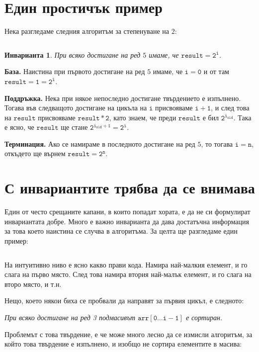 \documentclass{article}
\theoremstyle{definition}
\theoremstyle{plain}
\newtheorem*{invariant}{Инварианта}
\theoremstyle{remark}
\theoremstyle{definition}
\begin{document}
\section*{Един простичък пример}

Нека разгледаме следния алгоритъм за степенуване на $2$:
\inputminted[linenos]{c++}{algorithms/pow2.cpp}

\begin{invariant}
    При всяко достигане на ред $5$ имаме, че $\mathtt{result = 2^i}$.
\end{invariant}

\textbf{База.}
Наистина при първото достигане на ред $5$ имаме, че $\mathtt{i = 0}$ и от там $\mathtt{result = 1 = 2^i}$.

\textbf{Поддръжка.}
Нека при някое непоследно достигане твърдението е изпълнено.
Тогава във следващото достигане на цикъла на $\mathtt{i}$ присвояваме $\mathtt{i + 1}$, и след това на $\mathtt{result}$ присвояваме $\mathtt{result * 2}$, като знаем, че преди $\mathtt{result}$ е бил $\mathtt{2^{i_{old}}}$.
Така е ясно, че $\mathtt{result}$ ще стане $\mathtt{2^{i_{old} + 1} = 2^i}$.

\textbf{Терминация.}
Ако се намираме в последното достигане на ред $5$, то тогава $\mathtt{i = n}$, откъдето ще върнем $\mathtt{result = 2^n}$.

\pagebreak

\section*{С инвариантите трябва да се внимава}

Един от често срещаните капани, в които попадат хората, е да не си формулират инвариантата добре.
Много е важно инварианта да дава достатъчна информация за това което наистина се случва в алгоритъма.
За целта ще разгледаме един пример:
\inputminted[linenos]{c++}{algorithms/selection_sort.cpp}

На интуитивно ниво е ясно какво прави кода.
Намира най-малкия елемент, и го слага на първо място.
След това намира втория най-малък елемент, и го слага на второ място, и т.н.

Нещо, което някои биха се пробвали да направят за първия цикъл, е следното:
\begin{center}
    \textit{При всяко достигане на ред 3 подмасивът $\mathtt{arr[0 \dots i - 1]}$ е сортиран.}
\end{center}

Проблемът с това твърдение, е че може много лесно да се измисли алгоритъм, за който това твърдение е изпълнено, и изобщо не сортира елементите в масива:
\inputminted[linenos]{c++}{algorithms/trust_me_it_sorts.cpp}
\end{document}
